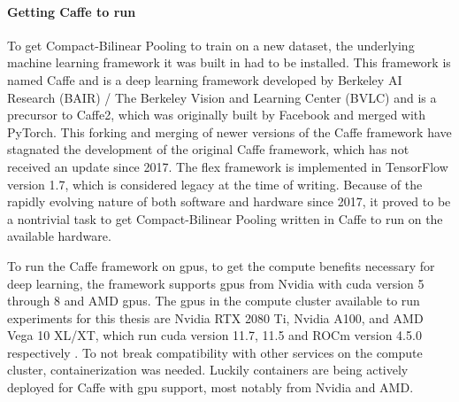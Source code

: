             \paragraph{Getting Caffe to run\\}
            To get Compact-Bilinear Pooling to train on a new dataset, the underlying machine learning framework it was built in had to be installed. This framework is named Caffe and is a deep learning framework developed by Berkeley AI Research (BAIR) / The Berkeley Vision and Learning Center (BVLC) and is a precursor to Caffe2, which was originally built by Facebook and merged with PyTorch. This forking and merging of newer versions of the Caffe framework have stagnated the development of the original Caffe framework, which has not received an update since 2017. The \gls{flex} framework is implemented in TensorFlow version 1.7, which is considered legacy at the time of writing. Because of the rapidly evolving nature of both software and hardware since 2017, it proved to be a nontrivial task to get Compact-Bilinear Pooling written in Caffe to run on the available hardware.

            To run the Caffe framework on \glspl{gpu}, to get the compute benefits necessary for deep learning, the framework supports \glspl{gpu} from Nvidia with \gls{cuda} version 5 through 8 \cite{CaffeInstallation, CaffeDeepLearning} and AMD \glspl{gpu}. The \glspl{gpu} in the compute cluster available to run experiments for this thesis are Nvidia RTX 2080 Ti, Nvidia A100, and AMD Vega 10 XL/XT, which run \gls{cuda} version 11.7, 11.5 and ROCm version 4.5.0 respectively \cite{MLNodesUniversitetet}. To not break compatibility with other services on the compute cluster, containerization was needed. Luckily containers are being actively deployed for Caffe with \gls{gpu} support, most notably from Nvidia and AMD.

